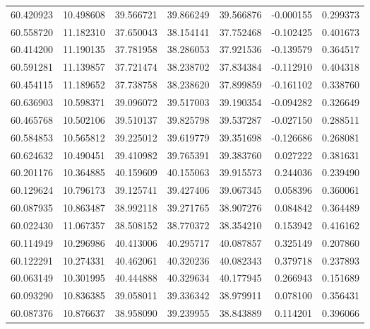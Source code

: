 \begin{tabular}{rrrrrrr}
 60.420923 &  10.498608 &         39.566721 &         39.866249 &         39.566876 & -0.000155 &  0.299373 \\
 60.558720 &  11.182310 &         37.650043 &         38.154141 &         37.752468 & -0.102425 &  0.401673 \\
 60.414200 &  11.190135 &         37.781958 &         38.286053 &         37.921536 & -0.139579 &  0.364517 \\
 60.591281 &  11.139857 &         37.721474 &         38.238702 &         37.834384 & -0.112910 &  0.404318 \\
 60.454115 &  11.189652 &         37.738758 &         38.238620 &         37.899859 & -0.161102 &  0.338760 \\
 60.636903 &  10.598371 &         39.096072 &         39.517003 &         39.190354 & -0.094282 &  0.326649 \\
 60.465768 &  10.502106 &         39.510137 &         39.825798 &         39.537287 & -0.027150 &  0.288511 \\
 60.584853 &  10.565812 &         39.225012 &         39.619779 &         39.351698 & -0.126686 &  0.268081 \\
 60.624632 &  10.490451 &         39.410982 &         39.765391 &         39.383760 &  0.027222 &  0.381631 \\
 60.201176 &  10.364885 &         40.159609 &         40.155063 &         39.915573 &  0.244036 &  0.239490 \\
 60.129624 &  10.796173 &         39.125741 &         39.427406 &         39.067345 &  0.058396 &  0.360061 \\
 60.087935 &  10.863487 &         38.992118 &         39.271765 &         38.907276 &  0.084842 &  0.364489 \\
 60.022430 &  11.067357 &         38.508152 &         38.770372 &         38.354210 &  0.153942 &  0.416162 \\
 60.114949 &  10.296986 &         40.413006 &         40.295717 &         40.087857 &  0.325149 &  0.207860 \\
 60.122291 &  10.274331 &         40.462061 &         40.320236 &         40.082343 &  0.379718 &  0.237893 \\
 60.063149 &  10.301995 &         40.444888 &         40.329634 &         40.177945 &  0.266943 &  0.151689 \\
 60.093290 &  10.836385 &         39.058011 &         39.336342 &         38.979911 &  0.078100 &  0.356431 \\
 60.087376 &  10.876637 &         38.958090 &         39.239955 &         38.843889 &  0.114201 &  0.396066 \\

\end{tabular}
